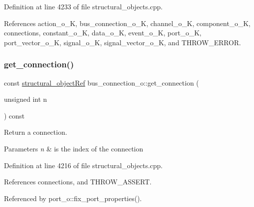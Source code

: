 Definition at line 4233 of file structural\+\_\+objects.\+cpp.



References action\+\_\+o\+\_\+K, bus\+\_\+connection\+\_\+o\+\_\+K, channel\+\_\+o\+\_\+K, component\+\_\+o\+\_\+K, connections, constant\+\_\+o\+\_\+K, data\+\_\+o\+\_\+K, event\+\_\+o\+\_\+K, port\+\_\+o\+\_\+K, port\+\_\+vector\+\_\+o\+\_\+K, signal\+\_\+o\+\_\+K, signal\+\_\+vector\+\_\+o\+\_\+K, and T\+H\+R\+O\+W\+\_\+\+E\+R\+R\+OR.

\mbox{\label{classbus__connection__o_acf9a1afb75c103ef417fdba4a87b2c0f}} 
\subsubsection{\texorpdfstring{get\+\_\+connection()}{get\_connection()}}
{\footnotesize\ttfamily const \hyperlink{structural__objects_8hpp_a8ea5f8cc50ab8f4c31e2751074ff60b2}{structural\+\_\+object\+Ref} bus\+\_\+connection\+\_\+o\+::get\+\_\+connection (\begin{DoxyParamCaption}\item[{unsigned int}]{n }\end{DoxyParamCaption}) const}



Return a connection. 


\begin{DoxyParams}{Parameters}
{\em n} & is the index of the connection \\
\hline
\end{DoxyParams}


Definition at line 4216 of file structural\+\_\+objects.\+cpp.



References connections, and T\+H\+R\+O\+W\+\_\+\+A\+S\+S\+E\+RT.



Referenced by port\+\_\+o\+::fix\+\_\+port\+\_\+properties().

